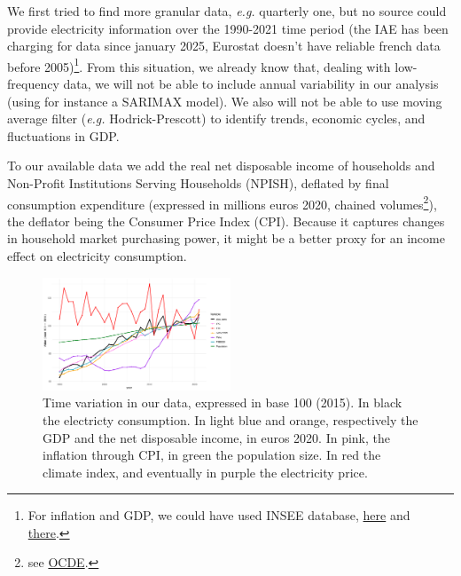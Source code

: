We first tried to find more granular data, \textit{e.g.} quarterly one, but no source could provide electricity information over the 1990-2021 time period (the IAE has been charging for data since january 2025, Eurostat doesn't have reliable french data before 2005)\footnote{For inflation and GDP, we could have used INSEE database, \href{https://www.insee.fr/fr/statistiques/serie/001763852\#Telechargement}{here} and
\href{https://www.insee.fr/fr/statistiques/8196636?sommaire=8182908\#consulter}{there}.}. From this situation, we already know that, dealing with low-frequency data, we will not be able to include annual variability in our analysis (using for instance a SARIMAX model). We also will not be able to use moving average filter (\textit{e.g.} Hodrick-Prescott) to identify trends, economic cycles, and fluctuations in GDP.

To our available data we add the real net disposable income of households and Non-Profit Institutions Serving Households (NPISH), deflated by final consumption expenditure (expressed in millions euros 2020, chained volumes\footnote{see \href{https://data-explorer.oecd.org/vis?pg=0&snb=12&vw=tb&df[ds]=dsDisseminateFinalDMZ&df[id]=DSD_NAAG\%40DF_NAAG_V&df[ag]=OECD.SDD.NAD&df[vs]=1.0&dq=A..B6GS1M_POP..&pd=1970\%2C&to[TIME_PERIOD]=false&lb=bt&lc=fr}{OCDE}.}), the deflator being the Consumer Price Index (CPI). Because it captures changes in household market purchasing power, it might be a better proxy for an income effect on electricity consumption.

\begin{figure}[h]
    \centering
      \includegraphics[width=0.5\textwidth]{Images/data_base100_2015.jpeg}
      \caption{Time variation in our data, expressed in base 100 (2015). In black the electricty consumption. In light blue and orange, respectively the GDP and the net disposable income, in euros 2020. In pink, the inflation through CPI, in green the population size. In red the climate index, and eventually in purple the electricity price.}
    \label{fig:var}
  \end{figure}

